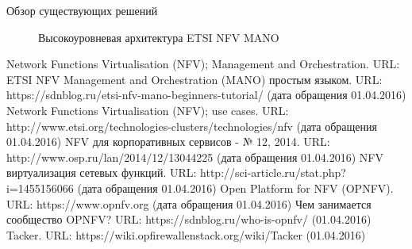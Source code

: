 \documentclass[oneside,final,14pt,a4paper]{extreport}
\begin{document}




\begin{table}
	\caption{Обзор существующих решений}
\end{table}

\begin{figure}[p]
	\caption{Высокоуровневая архитектура ETSI NFV MANO}
\end{figure}





\begin{thebibliography}{00}
 Network Functions Virtualisation (NFV); Management and Orchestration. URL: %
 ETSI NFV Management and Orchestration (MANO) простым языком. URL: https://sdnblog.ru/etsi-nfv-mano-beginners-tutorial/ (дата обращения 01.04.2016)
 Network Functions Virtualisation (NFV); use cases. URL: http://www.etsi.org/technologies-clusters/technologies/nfv (дата обращения 01.04.2016)
 NFV для корпоративных сервисов - № 12, 2014. URL: http://www.osp.ru/lan/2014/12/13044225 (дата обращения 01.04.2016)
 NFV виртуализация сетевых функций. URL: http://sci-article.ru/stat.php?i=1455156066 (дата обращения 01.04.2016)
 Open Platform for NFV (OPNFV). URL: https://www.opnfv.org (дата обращения 01.04.2016)
 Чем занимается сообщество OPNFV? URL:  https://sdnblog.ru/who-is-opnfv/ (01.04.2016)
 Tacker. URL: https://wiki.opfirewallenstack.org/wiki/Tacker (01.04.2016)
\end{thebibliography}

\end{document}
